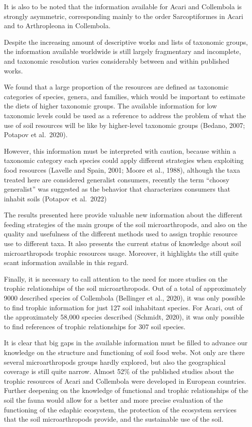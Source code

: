 \documentclass[11pt]{article}
\begin{document}
It is also to be noted that the information available for Acari and
Collembola is strongly asymmetric, corresponding mainly to the order
Sarcoptiformes in Acari and to Arthropleona in Collembola.

Despite the increasing amount of descriptive works and lists of
taxonomic groups, the information available worldwide is still largely
fragmentary and incomplete, and taxonomic resolution varies considerably
between and within published works.

We found that a large proportion of the resources are defined as
taxonomic categories of species, genera, and families, which would be
important to estimate the diets of higher taxonomic groups. The
available information for low taxonomic levels could be used as a
reference to address the problem of what the use of soil resources will
be like by higher-level taxonomic groups (Bedano, 2007; Potapov et
al.~2020).

However, this information must be interpreted with caution, because
within a taxonomic category each species could apply different
strategies when exploiting food resources (Lavelle and Spain, 2001;
Moore et al., 1988), although the taxa treated here are considered
generalist consumers, recently the term ``choosy generalist'' was
suggested as the behavior that characterizes consumers that inhabit
soils (Potapov et al.~2022)

The results presented here provide valuable new information about the
different feeding strategies of the main groups of the soil
microarthropods, and also on the quality and usefulness of the different
methods used to assign trophic resource use to different taxa. It also
presents the current status of knowledge about soil microarthropods
trophic resources usage. Moreover, it highlights the still quite scant
information available in this regard.

Finally, it is necessary to call attention to the need for more studies
on the trophic relationships of the soil microarthropods. Out of a total
of approximately 9000 described species of Collembola (Bellinger et al.,
2020), it was only possible to find trophic information for just 127
soil inhabitant species. For Acari, out of the approximately 58,000
species described (Schmidt, 2020), it was only possible to find
references of trophic relationships for 307 soil species.

It is clear that big gaps in the available information must be filled to
advance our knowledge on the structure and functioning of soil food
webs. Not only are there several microarthropods groups hardly explored,
but also the geographical coverage is still quite narrow. Almost 52\% of
the published studies about the trophic resources of Acari and
Collembola were developed in European countries. Further deepening on
the knowledge of functional and trophic relationships of the soil the
fauna would allow for a better and more precise evaluation of the
functioning of the edaphic ecosystem, the protection of the ecosystem
services that the soil microarthropods provide, and the sustainable use
of the soil.
\end{document}

